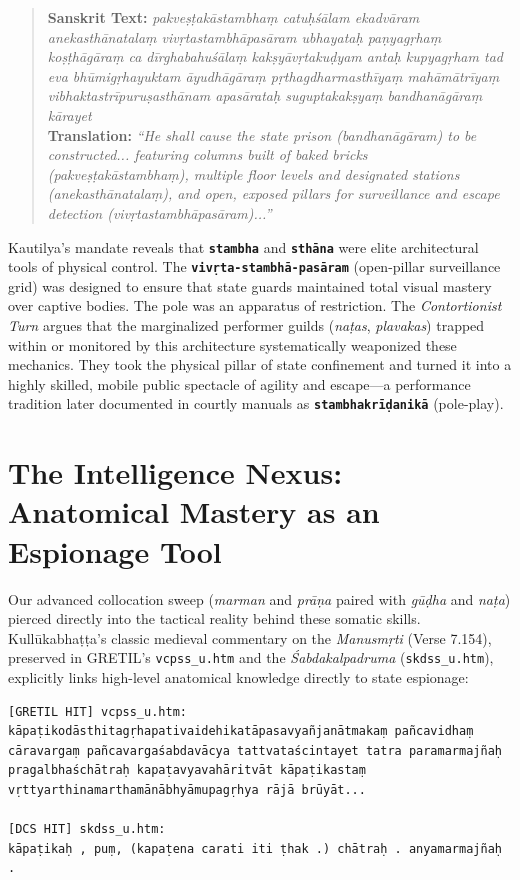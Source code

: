 \documentclass[11pt,letterpaper]{article}
\begin{document}
\begin{quotation}
\noindent \textbf{Sanskrit Text:} \textit{pakveṣṭakāstambhaṃ catuḥśālam ekadvāram anekasthānatalaṃ vivṛtastambhāpasāram ubhayataḥ paṇyagṛhaṃ koṣṭhāgāraṃ ca dīrghabahuśālaṃ kakṣyāvṛtakuḍyam antaḥ kupyagṛham tad eva bhūmigṛhayuktam āyudhāgāraṃ pṛthagdharmasthīyaṃ mahāmātrīyaṃ vibhaktastrīpuruṣasthānam apasārataḥ suguptakakṣyaṃ bandhanāgāraṃ kārayet} \\

\noindent \textbf{Translation:} \textit{``He shall cause the state prison (bandhanāgāram) to be constructed... featuring columns built of baked bricks (pakveṣṭakāstambhaṃ), multiple floor levels and designated stations (anekasthānatalaṃ), and open, exposed pillars for surveillance and escape detection (vivṛtastambhāpasāram)...''}
\end{quotation}

Kautilya's mandate reveals that \textbf{\texttt{stambha}} and \textbf{\texttt{sthāna}} were elite architectural tools of physical control. The \textbf{\texttt{vivṛta-stambhā-pasāram}} (open-pillar surveillance grid) was designed to ensure that state guards maintained total visual mastery over captive bodies. The pole was an apparatus of restriction. The \textit{Contortionist Turn} argues that the marginalized performer guilds (\textit{naṭas}, \textit{plavakas}) trapped within or monitored by this architecture systematically weaponized these mechanics. They took the physical pillar of state confinement and turned it into a highly skilled, mobile public spectacle of agility and escape---a performance tradition later documented in courtly manuals as \textbf{\texttt{stambhakrīḍanikā}} (pole-play).

\section{The Intelligence Nexus: Anatomical Mastery as an Espionage Tool}
Our advanced collocation sweep (\textit{marman} and \textit{prāṇa} paired with \textit{gūḍha} and \textit{naṭa}) pierced directly into the tactical reality behind these somatic skills. Kullūkabhaṭṭa's classic medieval commentary on the \textit{Manusmṛti} (Verse 7.154), preserved in GRETIL's \texttt{vcpss\_u.htm} and the \textit{Śabdakalpadruma} (\texttt{skdss\_u.htm}), explicitly links high-level anatomical knowledge directly to state espionage:

\begin{lstlisting}[basicstyle=\ttfamily\scriptsize]
[GRETIL HIT] vcpss_u.htm:
kāpaṭikodāsthitagṛhapativaidehikatāpasavyañjanātmakaṃ pañcavidhaṃ cāravargaṃ pañcavargaśabdavācya tattvataścintayet tatra paramarmajñaḥ pragalbhaśchātraḥ kapaṭavyavahāritvāt kāpaṭikastaṃ vṛttyarthinamarthamānābhyāmupagṛhya rājā brūyāt...

[DCS HIT] skdss_u.htm:
kāpaṭikaḥ , puṃ, (kapaṭena carati iti ṭhak .) chātraḥ . anyamarmajñaḥ .
\end{lstlisting}
\end{document}
